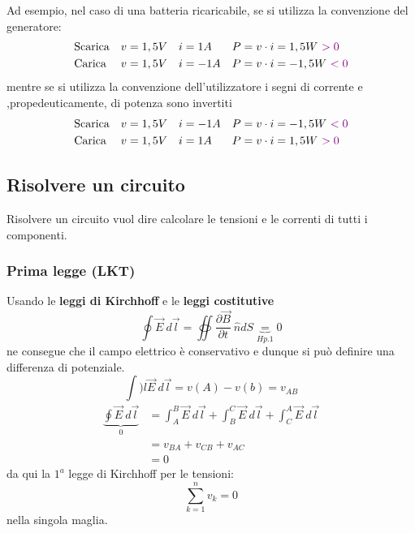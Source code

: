 \documentclass{article}
\begin{document}
Ad esempio, nel caso di una batteria ricaricabile, se si utilizza la convenzione del generatore:
\begin{align*}
    &\text{Scarica} & v&=1,5 V & i&=1A & P&=v\cdot i = 1,5W \ {\color{violet}>0}\\
    &\text{Carica} & v&=1,5 V & i&=-1A & P&=v\cdot i = -1,5W \ {\color{violet}<0}
\end{align*} 
mentre se si utilizza la convenzione dell'utilizzatore i segni di corrente e ,propedeuticamente, di potenza sono invertiti 
\begin{align*}
    &\text{Scarica} & v&=1,5 V & i&=-1A & P&=v\cdot i = -1,5W \ {\color{violet}<0}\\
    &\text{Carica} & v&=1,5 V & i&=1A & P&=v\cdot i = 1,5W \ {\color{violet}>0}
\end{align*} 


\subsection{Risolvere un circuito}
Risolvere un circuito vuol dire calcolare le tensioni e le correnti di tutti i componenti.
\subsubsection{Prima legge (LKT)}
Usando le \textbf{leggi di Kirchhoff} e le \textbf{leggi costitutive}
\[
    \oint \vec E \ d \vec l = \oiint \dfrac{\partial \vec B}{\partial t}\ \hat n dS \underbrace{=}_{Hp.1} 0
\]
ne consegue che il campo elettrico è conservativo e dunque si può definire una differenza di potenziale.
\[
    \int)l \vec E \ d \vec l = v(A) - v(b) = v_{AB}
\]
\begin{align*}
    \underbrace{\oint \vec E \ d \vec l}_{0} &= \int_{A}^{B} \vec E \ d\vec l + \int_{B}^{C} \vec E \ d\vec l + \int_{C}^{A} \vec E \ d\vec l \\
    &= v_{BA}+ v_{CB} + v_{AC} \\
    &= 0
\end{align*}
da qui la $1^a$ legge di Kirchhoff per le tensioni:
\[
    \sum_{k=1}^nv_k=0
\]
nella singola maglia.
\end{document}
